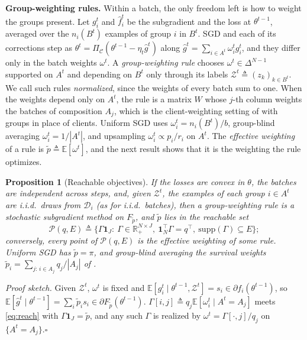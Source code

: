 \documentclass{article}
\newtheorem{proposition}[theorem]{Proposition}
\theoremstyle{definition}
\newcommand{\R}{\mathbb{R}}
\newcommand{\E}{\mathbb{E}}
\newcommand{\simplex}[1]{\Delta^{#1-1}}
\newcommand{\Proj}{\Pi_{\mathcal{C}}}
\newcommand{\Reach}{\mathcal{P}(q,E)}
\begin{document}
\noindent\textbf{Group-weighting rules.} Within a batch, the only freedom
left is how to weight the groups present. Let $g^t_i$ and $\hat f^t_i$ be
the subgradient and the loss at $\theta^{t-1}$, averaged over the
$n_i(B^t)$ examples of group $i$ in $B^t$. SGD and each of its
corrections step as $\theta^t=\Proj(\theta^{t-1}-\eta_t\hat g^t)$ along
$\hat g^t=\sum_{i\in A^t}\omega^t_ig^t_i$, and they differ only in the
batch weights $\omega^t$. A \emph{group-weighting rule} chooses
$\omega^t\in\simplex{N}$ supported on $A^t$ and depending on $B^t$ only
through its labels $\mathcal{Z}^t\triangleq(z_k)_{k\in B^t}$. We call such
rules \emph{normalized}, since the weights of every batch sum to one.
When the weights depend only on $A^t$, the rule is a matrix $W$ whose
$j$-th column weights the batches of composition $A_j$, which is the
client-weighting setting of \cite{rahimi2025fedavot,rahimi2026federage}
with groups in place of clients. Uniform SGD uses
$\omega^t_i=n_i(B^t)/b$, group-blind averaging $\omega^t_i=1/|A^t|$, and
upsampling $\omega^t_i\propto p_i/r_i$ on $A^t$. The \emph{effective
weighting} of a rule is $\tilde p\triangleq\E[\omega^t]$, and the next
result shows that it is the weighting the rule optimizes.
\vspace{-6pt}
\begin{proposition}[Reachable objectives]
\label{prop:surrogate}
If the losses are convex in $\theta$, the batches are independent across
steps, and, given $\mathcal{Z}^t$, the examples of each group $i\in A^t$
are i.i.d.\ draws from $\mathcal{D}_i$ (as for i.i.d.\ batches), then a
group-weighting rule is a stochastic subgradient method on $F_{\tilde p}$,
and $\tilde p$ lies in the \emph{reachable set}
\begin{equation}
\Reach\triangleq\big\{\Gamma\mathbf 1_J:\ \Gamma\in\R_+^{N\times J},\
\mathbf 1_N^\top\Gamma=q^\top,\ \mathrm{supp}(\Gamma)\subseteq E\big\};
\label{eq:reach}
\end{equation}
conversely, every point of $\Reach$ is the effective weighting of some
rule. Uniform SGD has $\tilde p=\pi$, and group-blind averaging the
survival weights $\tilde p_i=\sum_{j:\,i\in A_j}q_j/|A_j|$ of
\cite{rahimi2025agnostic,rahimi2026federage}.
\end{proposition}
\vspace{-8pt}
\noindent\emph{Proof sketch.} Given $\mathcal{Z}^t$, $\omega^t$ is fixed and
$\E[g^t_i\mid\theta^{t-1},\mathcal{Z}^t]=s_i\in\partial f_i(\theta^{t-1})$,
so $\E[\hat g^t\mid\theta^{t-1}]=\sum_i\tilde p_is_i\in\partial F_{\tilde
p}(\theta^{t-1})$. $\Gamma[i,j]\triangleq q_j\E[\omega^t_i\mid A^t=A_j]$
meets \eqref{eq:reach} with $\Gamma\mathbf 1_J=\tilde p$, and any such
$\Gamma$ is realized by $\omega^t=\Gamma[\cdot,j]/q_j$ on
$\{A^t=A_j\}$.\hfill$\square$
\end{document}
